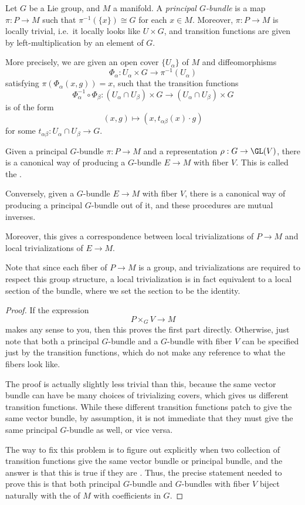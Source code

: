 \documentclass[a4paper]{article}
\begin{document}
\begin{defi}
  Let $G$ be a Lie group, and $M$ a manifold. A \emph{principal $G$-bundle} is a map $\pi: P \to M$ such that $\pi^{-1}(\{x\}) \cong G$ for each $x \in M$. Moreover, $\pi: P \to M$ is locally trivial, i.e.\ it locally looks like $U \times G$, and transition functions are given by left-multiplication by an element of $G$.

  More precisely, we are given an open cover $\{U_\alpha\}$ of $M$ and diffeomorphisms
  \[
    \Phi_\alpha: U_\alpha \times G \to \pi^{-1}(U_\alpha)
  \]
  satisfying $\pi(\Phi_\alpha(x, g)) = x$, such that the transition functions
  \[
    \Phi_\alpha^{-1} \circ \Phi_\beta: (U_\alpha \cap U_\beta) \times G \to (U_\alpha \cap U_\beta) \times G
  \]
  is of the form
  \[
    (x, g) \mapsto (x, t_{\alpha\beta}(x) \cdot g)
  \]
  for some $t_{\alpha\beta}: U_\alpha \cap U_\beta \to G$.
\end{defi}

\begin{thm}
  Given a principal $G$-bundle $\pi: P \to M$ and a representation $\rho: G \to \GL(V)$, there is a canonical way of producing a $G$-bundle $E \to M$ with fiber $V$. This is called the .

  Conversely, given a $G$-bundle $E\to M$ with fiber $V$, there is a canonical way of producing a principal $G$-bundle out of it, and these procedures are mutual inverses.

  Moreover, this gives a correspondence between local trivializations of $P \to M$ and local trivializations of $E \to M$.
\end{thm}
Note that since each fiber of $P \to M$ is a group, and trivializations are required to respect this group structure, a local trivialization is in fact equivalent to a local section of the bundle, where we set the section to be the identity.

\begin{proof}
  If the expression
  \[
    P \times_G V \to M
  \]
  makes any sense to you, then this proves the first part directly. Otherwise, just note that both a principal $G$-bundle and a $G$-bundle with fiber $V$ can be specified just by the transition functions, which do not make any reference to what the fibers look like.

  The proof is actually slightly less trivial than this, because the same vector bundle can have be many choices of trivializing covers, which gives us different transition functions. While these different transition functions patch to give the same vector bundle, by assumption, it is not immediate that they must give the same principal $G$-bundle as well, or vice versa.

  The way to fix this problem is to figure out explicitly when two collection of transition functions give the same vector bundle or principal bundle, and the answer is that this is true if they are . Thus, the precise statement needed to prove this is that both principal $G$-bundle and $G$-bundles with fiber $V$ biject naturally with the  of $M$ with coefficients in $G$.
\end{proof}
\end{document}

